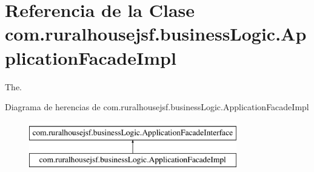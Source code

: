 \hypertarget{classcom_1_1ruralhousejsf_1_1business_logic_1_1_application_facade_impl}{}\section{Referencia de la Clase com.\+ruralhousejsf.\+business\+Logic.\+Application\+Facade\+Impl}
\label{classcom_1_1ruralhousejsf_1_1business_logic_1_1_application_facade_impl}


The.  


Diagrama de herencias de com.\+ruralhousejsf.\+business\+Logic.\+Application\+Facade\+Impl\begin{figure}[H]
\begin{center}
\leavevmode
\includegraphics[height=2.000000cm]{dc/dd7/classcom_1_1ruralhousejsf_1_1business_logic_1_1_application_facade_impl}
\end{center}
\end{figure}
